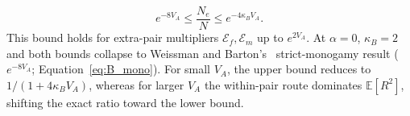 \documentclass{article}
\begin{document}
\begin{equation}
    e^{-8V_A} \le \frac{N_e}{N} \le e^{-4\kappa_B V_A}. \label{eq:C_mult_pair}
\end{equation}
This bound holds for extra-pair multipliers $\mathcal{E}_f, \mathcal{E}_m$ up to $e^{2V_A}$. At $\alpha = 0$, $\kappa_B = 2$ and both bounds collapse to Weissman and Barton's~\cite{weissman2012} strict-monogamy result ($e^{-8V_A}$; Equation~\eqref{eq:B_mono}). For small $V_A$, the upper bound reduces to $1/(1 + 4\kappa_B V_A)$, whereas for larger $V_A$ the within-pair route dominates $\mathbb{E}[R^2]$, shifting the exact ratio toward the lower bound.

\ifdefined\isMainDocument
\else
    \printbibliography
    
\end{document}
